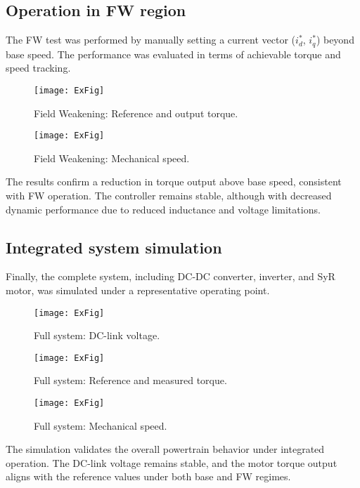 \subsection{Operation in FW region}

The FW test was performed by manually setting a current vector ($i_d^\ast$, $i_q^\ast$) beyond base speed. The performance was evaluated in terms of achievable torque and speed tracking.

\begin{figure}[H]
\centering
\texttt{[image: ExFig]}
\caption{Field Weakening: Reference and output torque.}
\label{fig:FW_torque}
\end{figure}

\begin{figure}[H]
\centering
\texttt{[image: ExFig]}
\caption{Field Weakening: Mechanical speed.}
\label{fig:FW_speed}
\end{figure}

The results confirm a reduction in torque output above base speed, consistent with FW operation. The controller remains stable, although with decreased dynamic performance due to reduced inductance and voltage limitations.

\subsection{Integrated system simulation}

Finally, the complete system, including DC-DC converter, inverter, and SyR motor, was simulated under a representative operating point.

\begin{figure}[H]
\centering
\texttt{[image: ExFig]}
\caption{Full system: DC-link voltage.}
\label{fig:full_dc}
\end{figure}

\begin{figure}[H]
\centering
\texttt{[image: ExFig]}
\caption{Full system: Reference and measured torque.}
\label{fig:full_torque}
\end{figure}

\begin{figure}[H]
\centering
\texttt{[image: ExFig]}
\caption{Full system: Mechanical speed.}
\label{fig:full_speed}
\end{figure}

The simulation validates the overall powertrain behavior under integrated operation. The DC-link voltage remains stable, and the motor torque output aligns with the reference values under both base and FW regimes.
